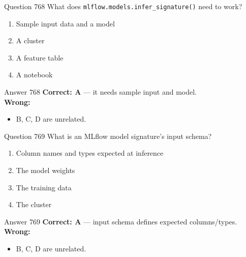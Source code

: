 \documentclass[aspectratio=169,11pt]{beamer}
\begin{document}
	\begin{frame}{Question 768}
		What does \texttt{mlflow.models.infer\_signature()} need to work?
		\begin{enumerate}[label=\Alph*.]
			\item Sample input data and a model
			\item A cluster
			\item A feature table
			\item A notebook
		\end{enumerate}
	\end{frame}
	\begin{frame}{Answer 768}
		\textbf{Correct: A} --- it needs sample input and model.\\
		\vspace{0.5em}
		\textbf{Wrong:}
		\begin{itemize}
			\item B, C, D are unrelated.
		\end{itemize}
	\end{frame}
	
	\begin{frame}{Question 769}
		What is an MLflow model signature's input schema?
		\begin{enumerate}[label=\Alph*.]
			\item Column names and types expected at inference
			\item The model weights
			\item The training data
			\item The cluster
		\end{enumerate}
	\end{frame}
	\begin{frame}{Answer 769}
		\textbf{Correct: A} --- input schema defines expected columns/types.\\
		\vspace{0.5em}
		\textbf{Wrong:}
		\begin{itemize}
			\item B, C, D are unrelated.
		\end{itemize}
	\end{frame}
	
\end{document}
